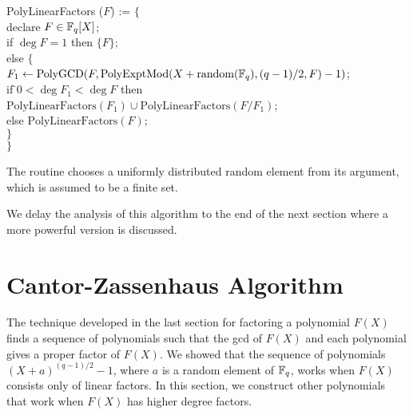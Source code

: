 \begindsacode
PolyLinearFactors ($F$) := $\{$ \\
\> declare $F \in \mathbb{F}_q[X]$; \\
\> if $\deg F = 1$ then $\{ F \}$; \\
\> else $\{$\\
\> \> $F_1 \leftarrow 
   \mbox{PolyGCD}(F, \mbox{PolyExptMod}(X+\mbox{random}(\mathbb{F}_q), (q-1)/2, F) -1)$;\\
\>\> if \=$0 < \deg F_1 < \deg F$ then \\
\>\>\> $\mbox{PolyLinearFactors}(F_1) \cup \mbox{PolyLinearFactors}(F/F_1)$;\\
\>\> else $\mbox{PolyLinearFactors}(F)$;\\
\>\> $\}$\\
\> $\}$
\enddsacode

\noindent
The routine  chooses a uniformly distributed random
element from its argument, which is assumed to be a finite set.

We delay the analysis of this algorithm to the end of the next section
where a more powerful version is discussed.


\section{Cantor-Zassenhaus Algorithm}
\label{PolyFF:Cantor:Sec}

The technique developed in the last section for factoring a polynomial
$F(X)$ finds a sequence of polynomials such that the {\sc gcd} of
$F(X)$ and each polynomial gives a proper factor of $F(X)$.  We showed
that the sequence of polynomials $(X+a)^{(q-1)/2} - 1$, where $a$ is a
random element of $\mathbb{F}_q$, works when $F(X)$ consists only of linear
factors.  In this section, we construct other polynomials that work
when $F(X)$ has higher degree factors.

